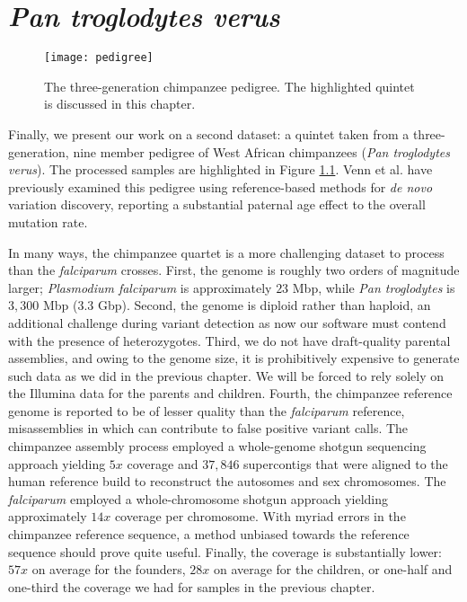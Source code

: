 \chapter{\textit{Pan troglodytes verus}}
\label{ch:chimp}

\begin{figure}[h!]
  \centering
    \texttt{[image: pedigree]}
  \caption{The three-generation chimpanzee pedigree.  The highlighted quintet is discussed in this chapter.}
  \label{fig:pedigree}
\end{figure}

Finally, we present our work on a second dataset: a quintet taken from a three-generation, nine member pedigree of West African chimpanzees (\textit{Pan troglodytes verus}).  The processed samples are highlighted in Figure \ref{fig:pedigree}.  Venn {et al.} have previously examined this pedigree using reference-based methods for \textit{de novo} variation discovery, reporting a substantial paternal age effect to the overall mutation rate\cite{Venn:2014ep}.

In many ways, the chimpanzee quartet is a more challenging dataset to process than the \textit{falciparum} crosses.  First, the genome is roughly two orders of magnitude larger; \textit{Plasmodium falciparum} is approximately $23$ Mbp, while \textit{Pan troglodytes} is $3,300$ Mbp ($3.3$ Gbp).  Second, the genome is diploid rather than haploid, an additional challenge during variant detection as now our software must contend with the presence of heterozygotes.  Third, we do not have draft-quality parental assemblies, and owing to the genome size, it is prohibitively expensive to generate such data as we did in the previous chapter.  We will be forced to rely solely on the Illumina data for the parents and children.  Fourth, the chimpanzee reference genome is reported to be of lesser quality than the \textit{falciparum} reference, misassemblies in which can contribute to false positive variant calls\cite{Mallick:2009go}.  The chimpanzee assembly process employed a whole-genome shotgun sequencing approach yielding $5x$ coverage and $37,846$ supercontigs that were aligned to the human reference build to reconstruct the autosomes and sex chromosomes\cite{ChimpanzeeSequencingandAnalysisConsortium:2005fa}.  The \textit{falciparum} employed a whole-chromosome shotgun approach yielding approximately $14x$ coverage per chromosome.  With myriad errors in the chimpanzee reference sequence, a method unbiased towards the reference sequence should prove quite useful.  Finally, the coverage is substantially lower: $57x$ on average for the founders, $28x$ on average for the children, or one-half and one-third the coverage we had for samples in the previous chapter.

